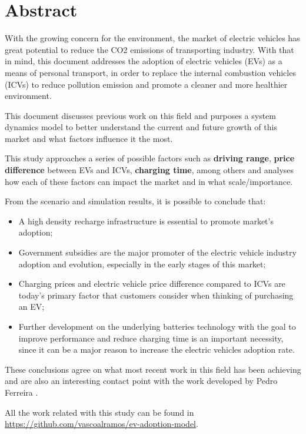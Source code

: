 \section{Abstract} \label{section:abstract}
With the growing concern for the environment, the market of electric vehicles has great potential to reduce the CO2 emissions of transporting industry. With that in mind, this document addresses the adoption of electric vehicles (EVs) as a means of personal transport, in order to replace the internal combustion vehicles (ICVs) to reduce pollution emission and promote a cleaner and more healthier environment.

This document discusses previous work on this field and purposes a system dynamics model to better understand the current and future growth of this market and what factors influence it the most.

This study approaches a series of possible factors such as \textbf{driving range}, \textbf{price difference} between EVs and ICVs, \textbf{charging time}, among others and analyses how each of these factors can impact the market and in what scale/importance.

From the scenario and simulation results, it is possible to conclude that:
\begin{itemize}
\item A high density recharge infrastructure is essential to promote market's adoption;
\item Government subsidies are the major promoter of the electric vehicle industry adoption and evolution, especially in the early stages of this market;
\item Charging prices and electric vehicle price difference compared to ICVs are today's primary factor that customers consider when thinking of purchasing an EV;
\item Further development on the underlying batteries technology with the goal to improve performance and reduce charging time is an important necessity, since it can be a major reason to increase the electric vehicles adoption rate.
\end{itemize}

These conclusions agree on what most recent work in this field has been achieving and are also an interesting contact point with the work developed by Pedro Ferreira \cite{pedro-report}.

All the work related with this study can be found in \url{https://github.com/vascoalramos/ev-adoption-model}.

\clearpage